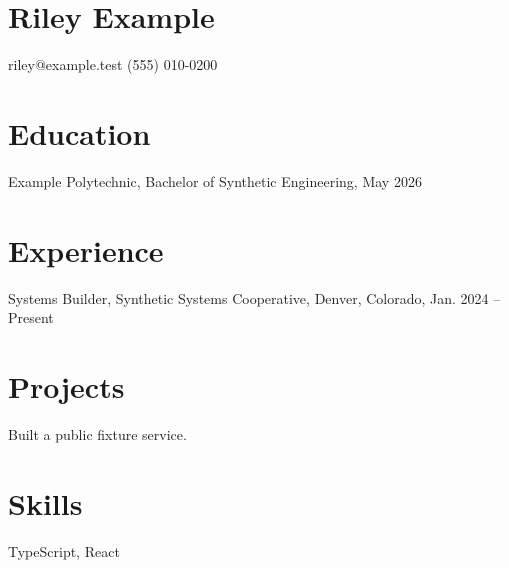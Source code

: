 \documentclass{article}
\begin{document}
\section*{Riley Example}
riley@example.test \quad (555) 010-0200
\section*{Education}
Example Polytechnic, Bachelor of Synthetic Engineering, May 2026
\section*{Experience}
Systems Builder, Synthetic Systems Cooperative, Denver, Colorado, Jan. 2024 -- Present
\section*{Projects}
Built a public fixture service.
\section*{Skills}
TypeScript, React
\end{document}
